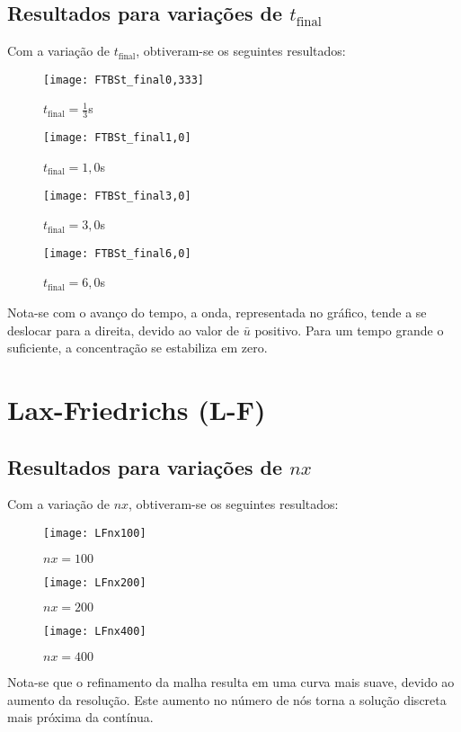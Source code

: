 \subsection{Resultados para variações de $t_{\text{final}}$}
Com a variação de $t_{\text{final}}$, obtiveram-se os seguintes resultados:
\begin{figure}[H]
    \centering
    \texttt{[image: FTBSt\_final0,333]}
    \caption{$t_{\text{final}} = \frac{1}{3}$s}
\end{figure}
\begin{figure}[H]
    \centering
    \texttt{[image: FTBSt\_final1,0]}
    \caption{$t_{\text{final}} = 1,0$s}
\end{figure}
\begin{figure}[H]
    \centering
    \texttt{[image: FTBSt\_final3,0]}
    \caption{$t_{\text{final}} = 3,0$s}
\end{figure}
\begin{figure}[H]
    \centering
    \texttt{[image: FTBSt\_final6,0]}
    \caption{$t_{\text{final}} = 6,0$s}
\end{figure}
Nota-se com o avanço do tempo, a onda, representada no gráfico, tende a se
deslocar para a direita, devido ao valor de $\bar{u}$ positivo. Para um tempo
grande o suficiente, a concentração se estabiliza em zero.

\section{Lax-Friedrichs (L-F)}

\subsection{Resultados para variações de $nx$}
Com a variação de $nx$, obtiveram-se os seguintes resultados:
\begin{figure}[H]
    \centering
    \texttt{[image: LFnx100]}
    \caption{$nx = 100$}
\end{figure}
\begin{figure}[H]
    \centering
    \texttt{[image: LFnx200]}
    \caption{$nx = 200$}
\end{figure}
\begin{figure}[H]
    \centering
    \texttt{[image: LFnx400]}
    \caption{$nx = 400$}
\end{figure}
Nota-se que o refinamento da malha resulta em uma curva mais suave, devido ao
aumento da resolução. Este aumento no número de nós torna a solução discreta
mais próxima da contínua.

